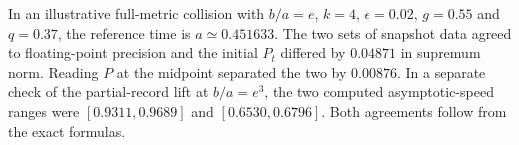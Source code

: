 In an illustrative full-metric collision with $b/a=e$,
$k=4$, $\epsilon=0.02$, $g=0.55$ and $q=0.37$,
the reference time is $a\simeq0.451633$.
The two sets of snapshot data agreed to floating-point
precision and the initial $P_t$ differed by $0.04871$
in supremum norm. Reading $P$ at the midpoint separated
the two by $0.00876$. In a separate check of the partial-record
lift at $b/a=e^3$, the two computed asymptotic-speed ranges
were $[0.9311,0.9689]$ and $[0.6530,0.6796]$.
Both agreements follow from the exact formulas.
